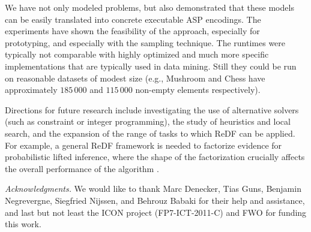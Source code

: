 

We have not only modeled problems, but also demonstrated that these models can be easily 
translated into concrete executable ASP encodings.
The experiments have shown the feasibility of the approach, especially for prototyping, and especially with the sampling technique.
The runtimes were typically not comparable with highly optimized and much more specific implementations that are typically used in data mining. 
Still they could be run on reasonable datasets of modest size (e.g.,  Mushroom and Chess have approximately $185\,000$ and $115\,000$ non-empty elements respectively). 

Directions for future research include investigating the use of alternative solvers (such as constraint or integer programming), the 
  study of heuristics and local search, and the expansion of the range of tasks to which ReDF can be applied. For example, a general ReDF framework is needed to factorize evidence for probabilistic lifted inference, where the shape of the factorization crucially affects the overall performance of the algorithm \parencite{DBLP:conf/nips/BroeckD13}.

\textit{Acknowledgments.}  We would like to thank Marc Denecker, Tias Guns, Benjamin Negrevergne, Siegfried Nijssen, and Behrouz Babaki for their help and assistance, and last but not least the ICON project (FP7-ICT-2011-C) and FWO for funding this work.
